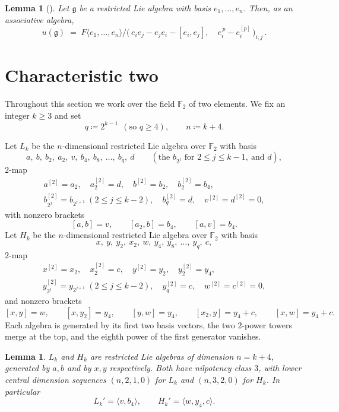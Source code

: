 \documentclass[11pt,reqno]{amsart}
\theoremstyle{plain}
\newtheorem{lemma}[theorem]{Lemma}
\theoremstyle{remark}
\newcommand{\Ft}{\mathbb{F}_2}
\newcommand{\spann}[1]{\langle #1\rangle}
\begin{document}
\begin{lemma}[\cite{Jacobson}]\label{lem:pres}
Let $\mathfrak{g}$ be a restricted Lie algebra with basis $e_1,\dots,e_n$. Then, as an
associative algebra,
\begin{equation*}
u(\mathfrak{g})\;=\;F\langle e_1,\dots,e_n\rangle\Big/
\bigl(\,e_ie_j-e_je_i-[e_i,e_j],\quad e_i^{\,p}-e_i^{[p]}\,\bigr)_{i,j}\,.
\tag{P}\label{eq:pres}
\end{equation*}
\end{lemma}


\section{Characteristic two}\label{sec:char2}

Throughout this section we work over the field $\Ft$ of two elements. We fix an integer $k\ge3$ and set
\[
q\coloneqq 2^{k-1}\ \ (\text{so } q\ge4),\qquad n\coloneqq k+4 .
\]

Let $L_k$ be the $n$-dimensional restricted Lie algebra over $\Ft$ with basis
\[
a,\ b,\ b_2,\ a_2,\ v,\ b_4,\ b_8,\ \dots,\ b_{q},\ d
\qquad(\text{the } b_{2^j} \text{ for } 2\le j\le k-1,\ \text{and } d),
\]
$2$-map
\begin{gather*}
a^{[2]}=a_2,\quad a_2^{[2]}=d,\quad
b^{[2]}=b_2,\quad b_2^{[2]}=b_4,\\
b_{2^j}^{[2]}=b_{2^{j+1}}\ (2\le j\le k-2),
\quad b_{q}^{[2]}=d,\quad v^{[2]}=d^{[2]}=0,
\end{gather*}
with nonzero brackets
\[
[a,b]=v,\qquad [a_2,b]=b_4,\qquad [a,v]=b_4 .
\]
Let $H_k$ be the $n$-dimensional restricted Lie algebra over $\Ft$ with basis
\[
x,\ y,\ y_2,\ x_2,\ w,\ y_4,\ y_8,\ \dots,\ y_{q},\ c,
\]
$2$-map
\begin{gather*}
x^{[2]}=x_2,\quad x_2^{[2]}=c,\quad
y^{[2]}=y_2,\quad y_2^{[2]}=y_4,\\
y_{2^j}^{[2]}=y_{2^{j+1}}\ (2\le j\le k-2),
\quad y_{q}^{[2]}=c,\quad w^{[2]}=c^{[2]}=0,
\end{gather*}
and nonzero brackets
\[
[x,y]=w,\qquad [x,y_2]=y_4,\qquad [y,w]=y_4,\qquad
[x_2,y]=y_4+c,\qquad [x,w]=y_4+c.
\]
Each algebra is generated by its first two basis vectors, the two $2$-power towers
merge at the top, and the eighth power of the first generator vanishes.

\begin{lemma}\label{lem:valid2}
$L_k$ and $H_k$ are restricted Lie algebras of dimension $n=k+4$, generated
by $a,b$ and by $x,y$ respectively. Both have nilpotency class $3$, with
lower central dimension sequences $(n,2,1,0)$ for $L_k$ and $(n,3,2,0)$ for
$H_k$. In particular
\[
L_k'=\spann{v,b_4},\qquad H_k'=\spann{w,y_4,c}.
\]
\end{lemma}
\end{document}

